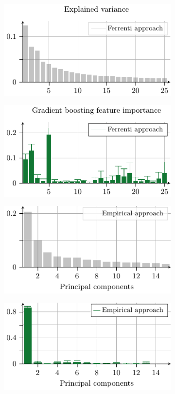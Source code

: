 \documentclass[superscriptaddress,
preprint,
 amsmath,amssymb,
 aps,
]{revtex4-2}
\begin{document}
\begin{figure}[t]
    \centering
    \begin{subfigure}[b]{0.45\textwidth}
        \includegraphics{figure5a}
        \label{fig:01-fi-e}
    \end{subfigure}
    \begin{subfigure}[b]{0.45\textwidth}
        \includegraphics{figure5b}
        \label{fig:01-fi-d}
    \end{subfigure}%
    \hfill
    \begin{subfigure}[b]{0.45\textwidth}
        \includegraphics{figure5c}
        \label{fig:03-fi-e}
        \subcaption{}
    \end{subfigure}
    \begin{subfigure}[b]{0.45\textwidth}
        \includegraphics{figure5d}

\end{subfigure}
\end{figure}
\end{document}
